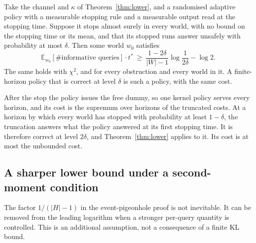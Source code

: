 \begin{theorem}
\label{thm:lowerstop}
Take the channel and $\kappa$ of Theorem~\ref{thm:lower}, and a randomised adaptive policy with
a measurable stopping rule and a measurable output read at the stopping time. Suppose it stops
almost surely in every world, with no bound on the stopping time or its mean, and that its
stopped runs answer unsafely with probability at most $\delta$. Then some world $w_{0}$ satisfies
\[
\mathbb{E}_{w_{0}}[\#\text{informative queries}]\cdot t^{*}\ \ge\
\frac{1-2\delta}{|W|-1}\log\frac1{2\delta}-\log2 .
\]
The same holds with $\chi^{2}$, and for every obstruction and every world in it. A finite-horizon
policy that is correct at level $\delta$ is such a policy, with the same cost.
\end{theorem}


After the stop the policy issues the free dummy, so one kernel policy serves every horizon, and
its cost is the supremum over horizons of the truncated costs. At a horizon by which every world
has stopped with probability at least $1-\delta$, the truncation answers what the policy answered
at its first stopping time. It is therefore correct at level $2\delta$, and
Theorem~\ref{thm:lower} applies to it. Its cost is at most the unbounded cost.

\subsection{A sharper lower bound under a second-moment condition}
The factor $1/(|H|-1)$ in the event-pigeonhole proof is not inevitable. It can be removed
from the leading logarithm when a stronger per-query quantity is controlled. This is an
additional assumption, not a consequence of a finite KL bound.


